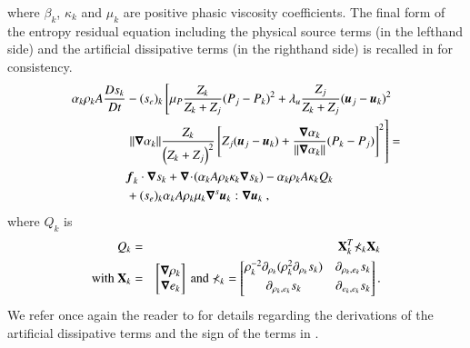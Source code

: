 \documentclass[preprint,10pt]{elsarticle}
\begin{document}
%
where $\beta_k$, $\kappa_k$ and $\mu_k$ are positive phasic viscosity coefficients. The final form of the entropy residual equation including the physical source terms (in the lefthand side) and the artificial dissipative terms (in the righthand side) is recalled in  for consistency.
%
\begin{align} \label{eq:full-ent-equ-7-eq-model}
\alpha_k \rho_k A \frac{Ds_k}{Dt} &- (s_{e})_k \left[\mu_P \frac{Z_k}{Z_k+Z_j} (P_j - P_k)^2 + \lambda_u \frac{Z_j}{Z_k+Z_j} (\boldsymbol u_j -\boldsymbol u_k)^2 \right. \nonumber
\\
&\left. \| \boldsymbol\nabla \alpha_k \| \frac{Z_k}{\left( Z_k+Z_j \right)^2} \left[ Z_j (\boldsymbol u_j-\boldsymbol u_k)+\frac{\boldsymbol\nabla \alpha_k}{\| \boldsymbol\nabla \alpha_k \|}(P_k-P_j)\right]^2 \right] = \nonumber \\
&\boldsymbol f_k \cdot \boldsymbol\nabla s_k + \boldsymbol\nabla\! \cdot \! \left( \alpha_k A \rho_k \kappa_k  \boldsymbol\nabla s_k \right) 
- \alpha_k \rho_k A \kappa_k Q_k \nonumber \\
&+ (s_e)_k \alpha_k A \rho_k \mu_k \boldsymbol\nabla^s \boldsymbol u_k : \boldsymbol\nabla \boldsymbol u_k \ ,
\end{align}
%
where $Q_k$ is 
%
\begin{eqnarray}
Q_k &=& \mathbf{X}^T_k \mathbb{\Sigma}_k \mathbf{X}_k \nonumber \\
\text{with } \mathbf{X}_k &=& \begin{bmatrix}
\boldsymbol\nabla \rho_k \\
\boldsymbol\nabla e_k 
\end{bmatrix}
\text{ and } \mathbb{\Sigma}_k = \begin{bmatrix}
       \rho_k^{-2} \partial_{\rho_k} (\rho^2_k \partial_{\rho_k} s_k) & \partial_{\rho_k,e_k} s_k  \\[0.3em]
       \partial_{\rho_k,e_k} s_k & \partial_{e_k,e_k} s_k           \\[0.3em]
     \end{bmatrix}. \nonumber 
\end{eqnarray}
%
We refer once again the reader to \cite{Marco_paper_sem} for details regarding the derivations of the artificial dissipative terms and the sign of the terms in .\\
 \\
\end{document}
